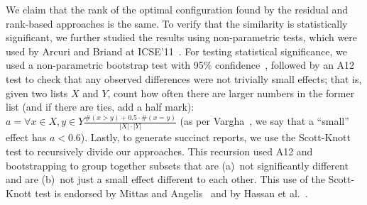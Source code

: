 \documentclass[sigconf]{acmart}
\begin{document}
We claim that the rank of the optimal configuration found by the residual and rank-based approaches is the same. To verify that the similarity is statistically significant, we further studied the results using non-parametric tests, which were used by Arcuri and Briand at ICSE'11~\cite{mittas13}. For testing statistical significance,
we used a non-parametric bootstrap test with 95\% confidence~\cite{efron93}, followed by
an A12 test to check that any observed differences were not trivially small effects;
that is, given two lists $X$ and $Y$, count how often there are larger
numbers in the former list (and if there are ties, add a half mark):
$a=\forall x\in X, y\in Y\frac{\#(x>y) + 0.5\cdot\#(x=y)}{|X|\cdot|Y|}$
(as per Vargha~\cite{Vargha00}, we say that a ``small'' effect has $a <0.6$). 
Lastly, to generate succinct reports, we use the Scott-Knott test to recursively
divide our approaches. This recursion used A12 and bootstrapping  
to group together subsets that are (a)~not significantly different and are (b)~not
just a small effect different to each other. This use of the Scott-Knott test is endorsed
by Mittas and Angelis~\cite{mittas13}
and by Hassan et al.~\cite{7194626}.

\end{document}
